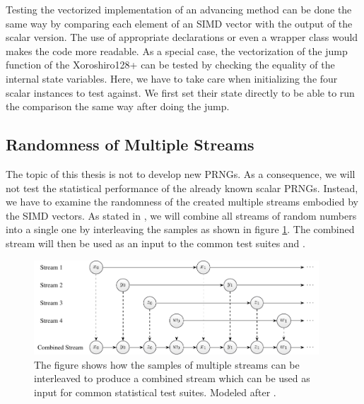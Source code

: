 \documentclass{stdlocal}
\begin{document}
    Testing the vectorized implementation of an advancing method can be done the same way by comparing each element of an SIMD vector with the output of the scalar version.
    The use of appropriate  declarations or even a wrapper class would makes the code more readable.
    As a special case, the vectorization of the jump function of the Xoroshiro128+ can be tested by checking the equality of the internal state variables.
    Here, we have to take care when initializing the four scalar instances to test against.
    We first set their state directly to be able to run the comparison the same way after doing the jump.

  \subsection{Randomness of Multiple Streams} %
  \label{sub:statistical_testing}
    The topic of this thesis is not to develop new PRNGs.
    As a consequence, we will not test the statistical performance of the already known scalar PRNGs.
    Instead, we have to examine the randomness of the created multiple streams embodied by the SIMD vectors.
    As stated in \textcite[\ppno~160-162]{kneusel2018}, we will combine all streams of random numbers into a single one by interleaving the samples as shown in figure \ref{fig:combined-stream}.
    The combined stream will then be used as an input to the common test suites  and  \autocite{testu01,dieharder}.
    \begin{figure}
      \center
      \includegraphics[width=0.95\textwidth]{figures/interleaving_multiple_streams.pdf}
      \caption[Combined Stream by Interleaving Samples of Multiple Streams]{%
        The figure shows how the samples of multiple streams can be interleaved to produce a combined stream which can be used as input for common statistical test suites.
        Modeled after \textcite[\pno~161]{kneusel2018}.
      }
      \label{fig:combined-stream}
    \end{figure}
\end{document}
